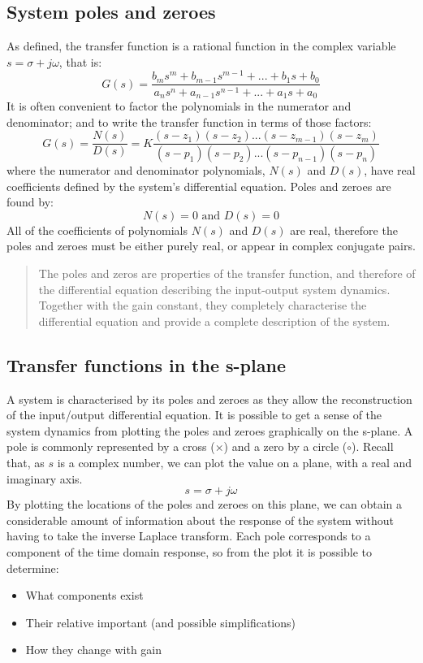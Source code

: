 \subsection{System poles and zeroes}
As defined, the transfer function is a rational function in the complex variable $s=\sigma + j\omega$, that is:
\begin{equation}
  G(s) = \frac{b_m s^m + b_{m-1} s^{m-1} + ... + b_1 s + b_0}{a_n s^n + a_{n-1} s^{n-1} + ... + a_1 s + a_0}
\end{equation}
It is often convenient to factor the polynomials in the numerator and denominator; and to write the transfer function in terms of those factors:
\begin{equation}
  G(s) = \frac{N(s)}{D(s)} = K\frac{(s-z_1)(s-z_2)...(s-z_{m-1})(s-z_m)}{(s-p_1)(s-p_2)...(s-p_{n-1})(s-p_n)}
\end{equation}
where the numerator and denominator polynomials, $N(s)$ and $D(s)$, have real coefficients defined by the system's differential equation. Poles and zeroes are found by:
\begin{equation}
  N(s) = 0 \textrm{ and } D(s) = 0
\end{equation}
All of the coefficients of polynomials $N(s)$ and $D(s)$ are real, therefore the poles and zeroes must be either purely real, or appear in complex conjugate pairs.
\begin{quotation}
  The poles and zeros are properties of the transfer function, and therefore of the differential equation describing the input-output system dynamics. Together with the gain constant, they completely characterise the differential equation and provide a complete description of the system.
\end{quotation}
\subsection{Transfer functions in the s-plane}
A system is characterised by its poles and zeroes as they allow the reconstruction of the input/output differential equation. It is possible to get a sense of the system dynamics from plotting the poles and zeroes graphically on the s-plane. A pole is commonly represented by a cross ($\times$) and a zero by a circle ($\circ$). Recall that, as $s$ is a complex number, we can plot the value on a plane, with a real and imaginary axis.
\begin{equation}
  s = \sigma + j\omega
\end{equation}
By plotting the locations of the poles and zeroes on this plane, we can obtain a considerable amount of information about the response of the system without having to take the inverse Laplace transform. Each pole corresponds to a component of the time domain response, so from the plot it is possible to determine:
\begin{itemize}
  \item What components exist
  \item Their relative important (and possible simplifications)
  \item How they change with gain
\end{itemize}
